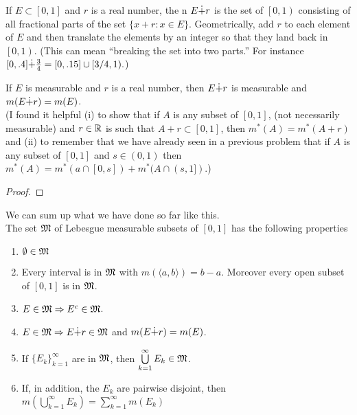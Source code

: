 \begin{defn}\label{d:dotplus}%
	If $E \subset [0,1]$ and $r$ is a real number, the n $E \dot{+} r$ is the set of 
	$\left[\left.0,1\right)\right.$ consisting of all fractional parts of the set 
	$\{x+r:x\in E\}$. Geometrically, add $r$ to each element of $E$ and then translate 
	the elements by an integer so that they land back in $\left[\left.0,1\right)\right.$. 
	(This can mean ``breaking the set into two parts.'' For instance $[0,.4] \dot{+} 
	\frac{3}{4} = [0,.15] \cup [3/4, 1).$)
\end{defn}

\begin{pblm}%
	If $E$ is measurable and $r$ is a real number, then $E \dot{+} r$ is 
	measurable and $m(E\dot{+} r) = m(E)$. \\ (I found it helpful (i) to 
	show that if $A$ is any subset of $[0,1]$, (not necessarily measurable) 
	and $r \in \mathbb{R}$ is such that $A + r \subset[0,1]$, then 
	$m^\ast(A) = m^\ast(A + r)$ and (ii) to remember that we have already 
	seen in a previous problem that if $A$ is any subset of $[0,1]$ and 
	$s \in (0,1)$ then $m^\ast(A) = m^\ast(a \cap [0,s]) + m^\ast(A\cap(s,1])$.)
\begin{proof}
\end{proof}
\end{pblm}

\begin{rmk}%
	We can sum up what we have done so far like this. \\
	The set $\mathfrak{M}$ of Lebesgue measurable subsets of $[0,1]$ has the following 
	properties
	\begin{enumerate}
		\item $\emptyset \in \mathfrak{M}$
		\item Every interval is in $\mathfrak{M}$ with $m\left(\langle a, b\rangle\right) = b - a$. 
		Moreover every open subset of $[0,1]$ is in $\mathfrak{M}$. 
		\item $E \in \mathfrak{M} \Rightarrow E^c \in \mathfrak{M}$. 
		\item $E \in \mathfrak{M} \Rightarrow E\dot{+} r \in \mathfrak{M}$ and $m(E \dot{+} r) = m(E)$. 
		\item If $\{E_k\}_{k=1}^\infty$ are in $\mathfrak{M}$, then $\bigcup\limits_{k=1}^\infty E_k \in 
		\mathfrak{M}$. 
		\item If, in addition, the $E_k$ are pairwise disjoint, then $m\left(\bigcup\limits_{k=1}^\infty 
		E_k \right) = \sum\limits_{k=1}^\infty m(E_k)$
	\end{enumerate}
\end{rmk}

